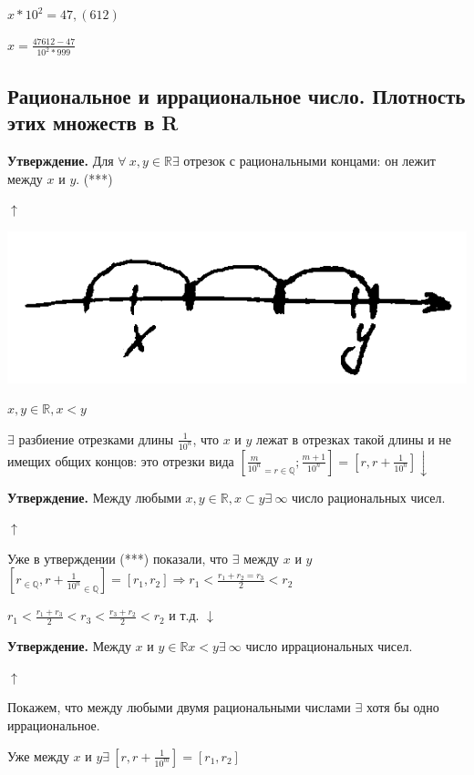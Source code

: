 \documentclass{article}
\begin{document}
        $x * 10^2 = 47,(612)$

        $x = \frac{47612 - 47}{10^2 * 999}$

        \subsection{Рациональное и иррациональное число. Плотность этих множеств в R}
        \textbf{Утверждение.} Для $\forall\ x, y \in \mathbb{R} \exists$ отрезок с рациональными концами: он лежит между $x$ и $y$. (***)

        $\uparrow$

        \includegraphics[scale=0.2]{d_ch_8}

        $x, y \in \mathbb{R}, x < y$

        $\exists$ разбиение отрезками длины $\frac{1}{10^n}$, что $x$ и $y$ лежат в отрезках такой длины и не имещих общих концов: это отрезки вида $[\frac{m}{10^n}_{ = r \in \mathbb{Q}}; \frac{m + 1}{10^n}] = [r, r + \frac{1}{10^n}] \downarrow$
        
        \textbf{Утверждение.} Между любыми $x, y \in \mathbb{R}, x \subset y \exists\ \infty$ число рациональных чисел.

        $\uparrow$

        Уже в утверждении (***) показали, что $\exists$ между $x$ и $y$ $[r_{\in \mathbb{Q}}, r + \frac{1}{10^n}_{\in \mathbb{Q}}] = [r_1, r_2] \Rightarrow r_1 < \frac{r_1 + r_2 = r_3}{2} < r_2$

        $r_1 < \frac{r_1 + r_3}{2} < r_3 < \frac{r_3 + r_2}{2} < r_2$ и т.д. $\downarrow$

        \textbf{Утверждение.} Между $x$ и $y \in \mathbb{R} x < y \exists\ \infty$ число иррациональных чисел.

        $\uparrow$

        Покажем, что между любыми двумя рациональными числами $\exists$ хотя бы одно иррациональное.

        Уже между $x$ и $y \exists\ [r, r + \frac{1}{10^m}] = [r_1, r_2]$ 
\end{document}
